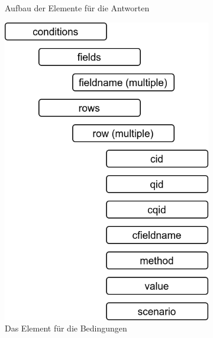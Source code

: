 \begin{figure}[h]
\begin{subfigure}[b]{.45\textwidth}
		\caption{Aufbau der Elemente für die Antworten}
	\end{subfigure}%
	\begin{minipage}[b]{.45\textwidth}
		\begin{subfigure}[b]{\linewidth}
			\includegraphics[width=.95\textwidth]{./img/append_lss_cond.png}
			\caption{Das Element für die Bedingungen}
		\end{subfigure}\\
		\begin{subfigure}[b]{\linewidth}

\end{subfigure}
\end{minipage}
\end{figure}
